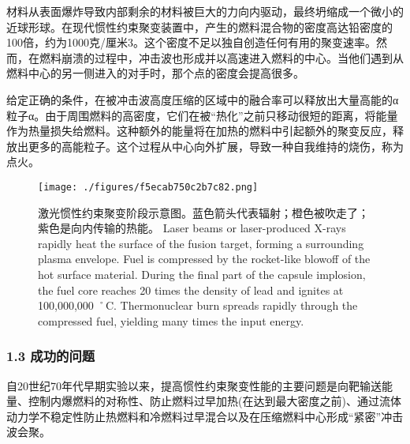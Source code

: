 材料从表面爆炸导致内部剩余的材料被巨大的力向内驱动，最终坍缩成一个微小的近球形球。在现代惯性约束聚变装置中，产生的燃料混合物的密度高达铅密度的100倍，约为1000克/厘米3。这个密度不足以独自创造任何有用的聚变速率。然而，在燃料崩溃的过程中，冲击波也形成并以高速进入燃料的中心。当他们遇到从燃料中心的另一侧进入的对手时，那个点的密度会提高很多。

给定正确的条件，在被冲击波高度压缩的区域中的融合率可以释放出大量高能的α粒子α。由于周围燃料的高密度，它们在被“热化”之前只移动很短的距离，将能量作为热量损失给燃料。这种额外的能量将在加热的燃料中引起额外的聚变反应，释放出更多的高能粒子。这个过程从中心向外扩展，导致一种自我维持的烧伤，称为点火。
\begin{figure}[ht]
\centering
\texttt{[image: ./figures/f5ecab750c2b7c82.png]}
\caption{激光惯性约束聚变阶段示意图。蓝色箭头代表辐射；橙色被吹走了；紫色是向内传输的热能。 Laser beams or laser-produced X-rays rapidly heat the surface of the fusion target, forming a surrounding plasma envelope. Fuel is compressed by the rocket-like blowoff of the hot surface material. During the final part of the capsule implosion, the fuel core reaches 20 times the density of lead and ignites at 100,000,000 ˚C. Thermonuclear burn spreads rapidly through the compressed fuel, yielding many times the input energy.} \label{fig_GXYS_2}
\end{figure}
\subsubsection{1.3 成功的问题}
自20世纪70年代早期实验以来，提高惯性约束聚变性能的主要问题是向靶输送能量、控制内爆燃料的对称性、防止燃料过早加热(在达到最大密度之前)、通过流体动力学不稳定性防止热燃料和冷燃料过早混合以及在压缩燃料中心形成“紧密”冲击波会聚。

